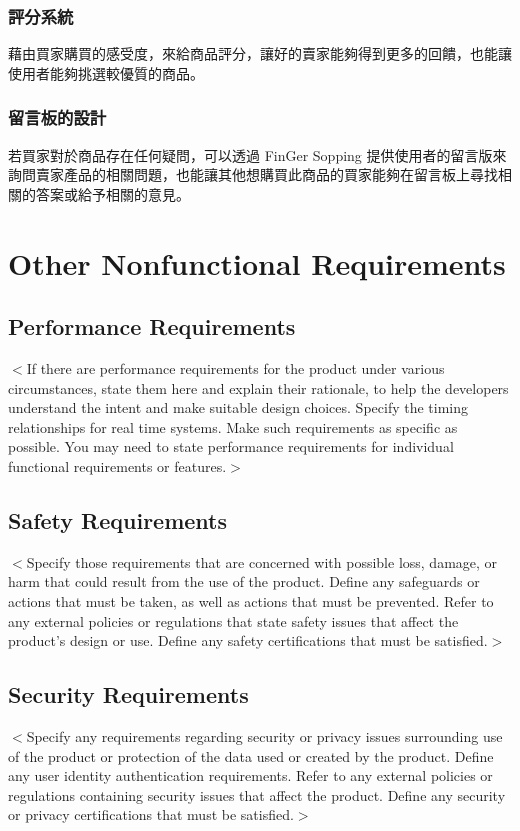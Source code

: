 \documentclass{scrreprt}
\begin{document}
\begin{CJK}{UTF8}{bkai}
\subsection{評分系統}
\qquad 藉由買家購買的感受度，來給商品評分，讓好的賣家能夠得到更多的回饋，也能讓使用者能夠挑選較優質的商品。

\subsection{留言板的設計}
\qquad 若買家對於商品存在任何疑問，可以透過 FinGer Sopping 提供使用者的留言版來詢問賣家產品的相關問題，也能讓其他想購買此商品的買家能夠在留言板上尋找相關的答案或給予相關的意見。

\chapter{Other Nonfunctional Requirements}

\section{Performance Requirements}
$<$If there are performance requirements for the product under various 
circumstances, state them here and explain their rationale, to help the 
developers understand the intent and make suitable design choices. Specify the 
timing relationships for real time systems. Make such requirements as specific 
as possible. You may need to state performance requirements for individual 
functional requirements or features.$>$

\section{Safety Requirements}
$<$Specify those requirements that are concerned with possible loss, damage, or 
harm that could result from the use of the product. Define any safeguards or 
actions that must be taken, as well as actions that must be prevented. Refer to 
any external policies or regulations that state safety issues that affect the 
product’s design or use. Define any safety certifications that must be 
satisfied.$>$

\section{Security Requirements}
$<$Specify any requirements regarding security or privacy issues surrounding use 
of the product or protection of the data used or created by the product. Define 
any user identity authentication requirements. Refer to any external policies or 
regulations containing security issues that affect the product. Define any 
security or privacy certifications that must be satisfied.$>$


\end{CJK}
\end{document}
